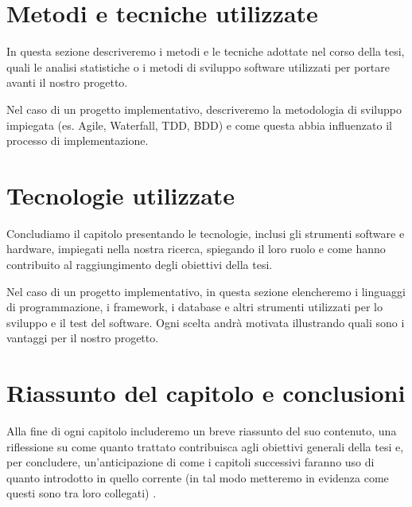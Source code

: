 \section{Metodi e tecniche utilizzate}

In questa sezione descriveremo i metodi e le tecniche adottate nel corso della tesi, quali le analisi statistiche o i metodi di sviluppo software utilizzati per portare avanti il nostro progetto.

\medskip

Nel caso di un progetto implementativo, descriveremo la metodologia di sviluppo impiegata (es. Agile, Waterfall, TDD, BDD) e come questa abbia influenzato il processo di implementazione.

\section{Tecnologie utilizzate}

Concludiamo il capitolo presentando le tecnologie, inclusi gli strumenti software e hardware, impiegati nella nostra ricerca, spiegando il loro ruolo e come hanno contribuito al raggiungimento degli obiettivi della tesi.

\medskip

Nel caso di un progetto implementativo, in questa sezione elencheremo i linguaggi di programmazione, i framework, i database e altri strumenti utilizzati per lo sviluppo e il test del software. Ogni scelta andrà motivata illustrando quali sono i vantaggi per il nostro progetto.

\section{Riassunto del capitolo e conclusioni}

Alla fine di ogni capitolo includeremo un breve riassunto del suo contenuto, una riflessione su come quanto trattato contribuisca agli obiettivi generali della tesi e, per concludere, un'anticipazione di come i capitoli successivi faranno uso di quanto introdotto in quello corrente (in tal modo metteremo in evidenza come questi sono tra loro collegati) \cite{zobel2015writing}.
